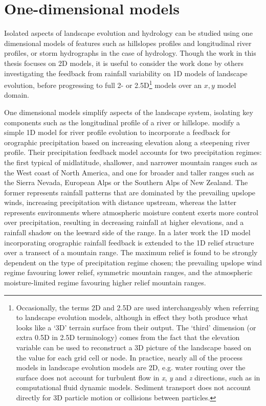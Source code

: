 \section{One-dimensional models}

Isolated aspects of landscape evolution and hydrology can be studied using one dimensional models of features such as hillslopes profiles and longitudinal river profiles, or storm hydrographs in the case of hydrology. Though the work in this thesis focuses on 2D models, it is useful to consider the work done by others investigating the feedback from rainfall variability on 1D models of landscape evolution, before progressing to full 2- or 2.5D\footnote{Occasionally, the terms 2D and 2.5D are used interchangeably when referring to landscape evolution models, although in effect they both produce what looks like a `3D' terrain surface from their output. The `third' dimension (or extra 0.5D in 2.5D terminology) comes from the fact that the elevation variable can be used to reconstruct a 3D picture of the landscape based on the value for each grid cell or node. In practice, nearly all of the process models in landscape evolution models are 2D, e.g. water routing over the surface does not account for turbulent flow in \textit{x}, \textit{y} and \textit{z} directions, such as in computational fluid dynamic models. Sediment transport does not account directly for 3D particle motion or collisions between particles.} models over an \(x,y\) model domain. 


One dimensional models simplify aspects of the landscape system, isolating key components such as the longitudinal profile of a river or hillslope.\citet{Roe2002} modify a simple 1D model for river profile evolution \citep{seidl1992problem,howard1994detachment} to incorporate a feedback for orographic precipitation based on increasing elevation along a steepening river profile. Their precipitation feedback model accounts for two precipitation regimes: the first typical of midlatitude, shallower, and narrower mountain ranges such as the West coast of North America, and one for broader and taller ranges such as the Sierra Nevada, European Alps or the Southern Alps of New Zealand. The former represents rainfall patterns that are dominated by the prevailing upslope winds, increasing precipitation with distance upstream, whereas the latter represents environments where atmospheric moisture content exerts more control over precipitation, resulting in decreasing rainfall at higher elevations, and a rainfall shadow on the leeward side of the range. In a later work \citep{Roe2003} the 1D model incorporating orographic rainfall feedback is extended to the 1D relief structure over a transect of a mountain range. The maximum relief is found to be strongly dependent on the type of precipitation regime chosen; the prevailing upslope wind regime favouring lower relief, symmetric mountain ranges, and the atmospheric moisture-limited regime favouring higher relief mountain ranges.

